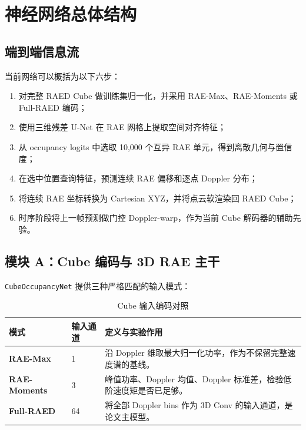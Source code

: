 \documentclass[11pt,a4paper,fontset=none]{ctexart}
\newcommand{\code}[1]{\texttt{#1}}
\begin{document}
\section{神经网络总体结构}

\subsection{端到端信息流}

当前网络可以概括为以下六步：
\begin{enumerate}
  \item 对完整 RAED Cube 做训练集归一化，并采用 RAE-Max、RAE-Moments 或 Full-RAED 编码；
  \item 使用三维残差 U-Net 在 RAE 网格上提取空间对齐特征；
  \item 从 occupancy logits 中选取 10,000 个互异 RAE 单元，得到离散几何与置信度；
  \item 在选中位置查询特征，预测连续 RAE 偏移和逐点 Doppler 分布；
  \item 将连续 RAE 坐标转换为 Cartesian XYZ，并将点云软渲染回 RAED Cube；
  \item 时序阶段将上一帧预测做门控 Doppler-warp，作为当前 Cube 解码器的辅助先验。
\end{enumerate}

\begin{center}
\setlength{\fboxsep}{8pt}
\end{center}

\subsection{模块 A：Cube 编码与 3D RAE 主干}

\code{CubeOccupancyNet} 提供三种严格匹配的输入模式：
\begin{table}[H]
\centering
\caption{Cube 输入编码对照}
\begin{tabularx}{\textwidth}{>{\bfseries}l l X}
\toprule
模式 & 输入通道 & 定义与实验作用 \\
\midrule
RAE-Max & 1 & 沿 Doppler 维取最大归一化功率，作为不保留完整速度谱的基线。\\
RAE-Moments & 3 & 峰值功率、Doppler 均值、Doppler 标准差，检验低阶速度矩是否已足够。\\
Full-RAED & 64 & 将全部 Doppler bins 作为 3D Conv 的输入通道，是论文主模型。\\
\bottomrule
\end{tabularx}
\end{table}
\end{document}
